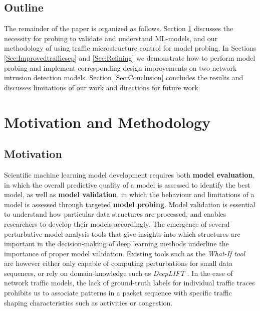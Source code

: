 \documentclass[10pt,conference]{IEEEtran}
\begin{document}
\subsection{Outline}

The remainder of the paper is organized as follows. Section \ref{Sec:Motivation} discusses the necessity for probing to validate and understand ML-models, and our methodology of using traffic microstructure control for model probing. In Sections \ref{Sec:Improvedtrafficsep} and \ref{Sec:Refining} we demonstrate how to perform model probing and implement corresponding design improvements on two network intrusion detection models. Section \ref{Sec:Conclusion} 
concludes the results and discusses limitations of our work and directions for future work.

\section{Motivation and Methodology}\label{Sec:Motivation}

\subsection{Motivation}

Scientific machine learning model development requires both \textbf{model evaluation}, in which the overall predictive quality of a model is assessed to identify the best model, as well as \textbf{model validation}, in which the behaviour and limitations of a model is assessed through targeted \textbf{model probing}. Model validation is essential to understand how particular data structures are processed, and enables researchers to develop their models accordingly. The emergence of several perturbative model analysis tools that give insights into which structures are important in the decision-making of deep learning methods underline the importance of proper model validation. Existing tools such as the \textit{What-If tool} \cite{wexler2019if} are however either only capable of computing perturbations for small data sequences, or rely on domain-knowledge such as \textit{DeepLIFT} \cite{shrikumar2017learning}. In the case of network traffic models, the lack of ground-truth labels for individual traffic traces prohibits us to associate patterns in a packet sequence with specific traffic shaping characteristics such as activities or congestion.


\end{document}
